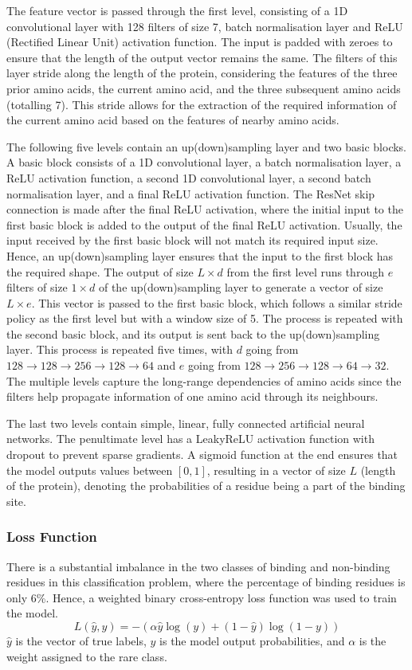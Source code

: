 \documentclass[journal=jcisd8,manuscript=article]{achemso}
\begin{document}
\newpage
The feature vector is passed through the first level, consisting of a 1D convolutional layer with 128 filters of size 7, batch normalisation layer and ReLU (Rectified Linear Unit) activation function. The input is padded with zeroes to ensure that the length of the output vector remains the same. The filters of this layer stride along the length of the protein, considering the features of the three prior amino acids, the current amino acid, and the three subsequent amino acids (totalling 7). This stride allows for the extraction of the required information of the current amino acid based on the features of nearby amino acids.

The following five levels contain an up(down)sampling layer and two basic blocks. A basic block consists of a 1D convolutional layer, a batch normalisation layer, a ReLU activation function, a second 1D convolutional layer, a second batch normalisation layer, and a final ReLU activation function. The ResNet skip connection is made after the final ReLU activation, where the initial input to the first basic block is added to the output of the final ReLU activation. Usually, the input received by the first basic block will not match its required input size. Hence, an up(down)sampling layer ensures that the input to the first block has the required shape. The output of size $L \times d$ from the first level runs through $e$ filters of size $1 \times d$ of the up(down)sampling layer to generate a vector of size $L \times e$. This vector is passed to the first basic block, which follows a similar stride policy as the first level but with a window size of 5. The process is repeated with the second basic block, and its output is sent back to the up(down)sampling layer. This process is repeated five times, with $d$ going from $128 \to 128 \to 256 \to 128 \to 64$ and $e$ going from $128 \to 256 \to 128 \to 64 \to 32$. The multiple levels capture the long-range dependencies of amino acids since the filters help propagate information of one amino acid through its neighbours.

The last two levels contain simple, linear, fully connected artificial neural networks. The penultimate level has a LeakyReLU activation function with dropout to prevent sparse gradients. A sigmoid function at the end ensures that the model outputs values between $[0, 1]$, resulting in a vector of size $L$ (length of the protein), denoting the probabilities of a residue being a part of the binding site.

\subsubsection{Loss Function}
\quad There is a substantial imbalance in the two classes of binding and non-binding residues in this classification problem, where the percentage of binding residues is only 6\%. Hence, a weighted binary cross-entropy loss function was used to train the model.
$$L(\hat{y}, y) = -(\alpha\hat{y}\log(y) + (1-\hat{y})\log(1-y))$$ \quad$\hat{y}$ is the vector of true labels, $y$ is the model output probabilities, and $\alpha$ is the weight assigned to the rare class.
\end{document}
